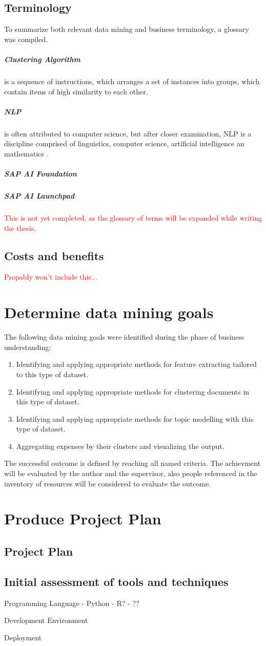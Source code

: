 \subsection{Terminology}
To summarize both relevant data mining and business terminology, a glossary was compiled.

	\subparagraph{Clustering Algorithm} is a sequence of instructions, which arranges a set of instances into groups, which contain items of high similarity to each other.
	\subparagraph{\ac{NLP}}is often attributed to computer science, but after closer examination, \ac{NLP} is a discipline comprised of linguistics, computer science, artificial intelligence an mathematics \cite{chowdhury2003}.
	
	\subparagraph{SAP AI Foundation}
	\subparagraph{SAP AI Launchpad}
	\textcolor{red}{This is not yet completed, as the glossary of terms will be expanded while writing the thesis.}

\subsection{Costs and benefits}
	\textcolor{red}{Propably won't include this...}

\section{Determine data mining goals}
The following data mining goals were identified during the phase of business understanding:

\begin{enumerate}
\item Identifying and applying appropriate methods for feature extracting tailored to this type of dataset.
\item Identifying and applying appropriate methods for clustering documents in this type of dataset.
\item Identifying and applying appropriate methods for topic modelling with this type of dataset.
\item Aggregating expenses by their clusters and visualizing the output.
\end{enumerate}

The successful outcome is defined by reaching all named criteria. The achievment will be evaluated by the author and the supervisor, also people referenced in the inventory of resources will be considered to evaluate the outcome.


\section{Produce Project Plan}

\subsection{Project Plan}

\subsection{Initial assessment of tools and techniques}
Programming Language
- Python
- R?
- ??

Development Environment

Deployment













